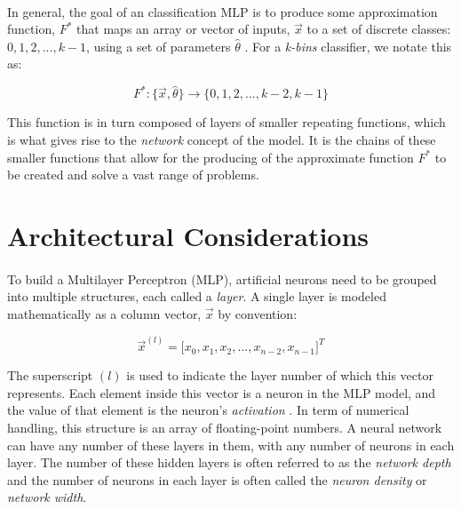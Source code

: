 \documentclass[12pt,letterpaper]{article}
\begin{document}
\paragraph*{}In general, the goal of an classification MLP is to produce some approximation function, $F^*$ that maps an array or vector of inputs, 
$\vec{x}$ to a set of discrete classes: $0,1,2,...,k-1$, using a set of parameters $\hat{\theta}$ \cite{Geron,Goodfellow,Petrik}. For a \textit{k-bins} classifier, we notate this as:

\begin{equation}
\label{approx}
F^* : \big\{ \vec{x},\hat{\theta}\big\} \rightarrow \big\{ 0,1,2,...,k-2,k-1 \big\}
\end{equation}

This function is in turn composed of layers of smaller repeating functions, which is what gives rise to the \textit{network} concept of the model. It is the chains of these smaller functions that allow for the producing of the approximate function $F^*$ to be created and solve a vast range of problems.



\section{Architectural Considerations}
\paragraph*{}To build a Multilayer Perceptron (MLP), artificial neurons need to be grouped into multiple structures, each called a \textit{layer}. A single layer is modeled mathematically as a column vector, $\vec{x}$ by convention:

\begin{equation}
\label{layer}
\vec{x}^{(l)} = \big[ x_0 , x_1 , x_2 , ... , x_{n-2} , x_{n-1} \big]^T
\end{equation}

The superscript $(l)$ is used to indicate the layer number of which this vector represents. Each element inside this vector is a neuron in the MLP model, and the value of that element is the neuron's \textit{activation} \cite{Geron}. In term of numerical handling, this structure is an array of floating-point numbers. A neural network can have any number of these layers in them, with any number of neurons in each layer. The number of these hidden layers is often referred to as the \textit{network depth} and the number of neurons in each layer is often called the \textit{neuron density} or \textit{network width}.
\end{document}
